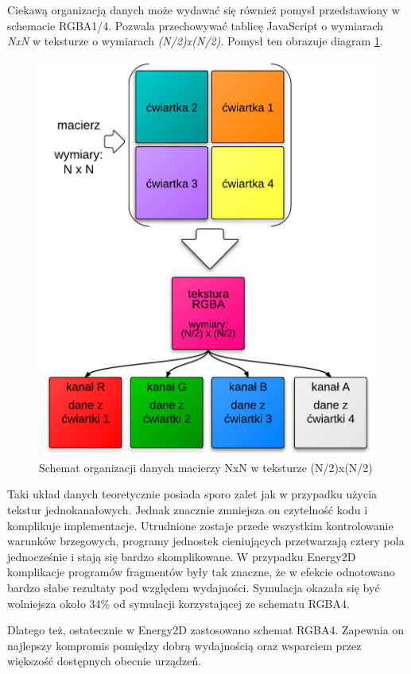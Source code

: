 Ciekawą organizacją danych może wydawać się również pomysł przedstawiony w
schemacie RGBA1/4. Pozwala przechowywać tablicę JavaScript o wymiarach
\emph{\mbox{NxN}} w teksturze o wymiarach \emph{\mbox{(N/2)x(N/2)}}. Pomysł
ten obrazuje diagram \ref{fig:rgba14Tex}.

\begin{figure}[hbp]
\centering
\includegraphics[width=.9\textwidth]{img/rgba14Tex}
\caption{Schemat organizacji danych macierzy NxN w teksturze (N/2)x(N/2)}
\label{fig:rgba14Tex}
\end{figure}

Taki układ danych teoretycznie posiada sporo zalet jak w przypadku użycia
tekstur jednokanałowych. Jednak znacznie zmniejsza on czytelność kodu i
komplikuje implementacje. Utrudnione zostaje przede wszystkim kontrolowanie
warunków brzegowych, programy jednostek cieniujących przetwarzają cztery pola
jednocześnie i stają się bardzo skomplikowane. W przypadku Energy2D komplikacje
programów fragmentów były tak znaczne, że w efekcie odnotowano bardzo słabe
rezultaty pod względem wydajności. Symulacja okazała się być wolniejsza około
34\% od symulacji korzystającej ze schematu RGBA4.

Dlatego też, ostatecznie w Energy2D zastosowano schemat RGBA4. Zapewnia on
najlepszy kompromis pomiędzy dobrą wydajnością oraz wsparciem przez większość
dostępnych obecnie urządzeń.
